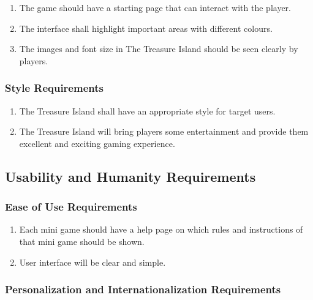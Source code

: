 \documentclass[]{article}
\begin{document}
\begin{enumerate}[{LF}1. ]
    \item The game should have a starting page that can interact with the player.
    \item The interface shall highlight important areas with different colours.
    \item The images and font size in The Treasure Island should be seen clearly by players.
\end{enumerate}


\subsubsection{Style Requirements}
\label{ssub:style_requirements}

\begin{enumerate}[{LF}1. ]
    \item The Treasure Island shall have an appropriate style for target users.
	\item The Treasure Island will bring players some entertainment and provide them excellent and exciting gaming experience.
\end{enumerate}



\subsection{Usability and Humanity Requirements}
\label{sub:usability_and_humanity_requirements}

\subsubsection{Ease of Use Requirements}
\label{ssub:ease_of_use_requirements}

\begin{enumerate}[{UH}1. ]
	\item Each mini game should have a help page on which rules and instructions of that mini game should be shown.
	\item User interface will be clear and simple.
\end{enumerate}


\subsubsection{Personalization and Internationalization Requirements}
\label{ssub:personalization_and_internationalization_requirements}
\end{document}
